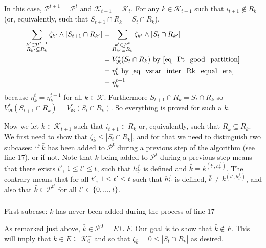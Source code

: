 \documentclass[
  11pt,
  a4paper,
]{article}
\makeatletter
\let\oldsubparagraph\subparagraph
\renewcommand{\subparagraph}{
    \@ifstar
      \xxxSubParagraphStar
      \xxxSubParagraphNoStar
  }
\newcommand{\xxxSubParagraphStar}[1]{\oldsubparagraph*{#1}\mbox{}}
\newcommand{\xxxSubParagraphNoStar}[1]{\oldsubparagraph{#1}\mbox{}}
\theoremstyle{plain}
\theoremstyle{definition}
\theoremstyle{plain}
\theoremstyle{definition}
\theoremstyle{plain}
\theoremstyle{remark}
\makeatother
\begin{document}
In this case, \(\mathcal{P}^{t+1}=\mathcal{P}^t\) and
\(\mathcal{K}_{t+1}=\mathcal{K}_t\). For any \(k\in\mathcal{K}_{t+1}\)
such that \(i_{t+1}\not\in R_k\) (or, equivalently, such that
\(S_{t+1}\cap R_k=S_t\cap R_k\)), \begin{align*}
\sum_{\substack{k'\in\mathcal{P}^{t+1} \\ R_{k'}\subseteq R_k}} \zeta_{k'}\wedge |S_{t+1}\cap R_{k'}|&=\sum_{\substack{k'\in\mathcal{P}^{t} \\ R_{k'}\subseteq R_k}} \zeta_{k'}\wedge |S_{t}\cap R_{k'}| \\
&=V^*_{\mathfrak{R}}(S_t\cap R_k) \text{ by~\eqref{eq_Pt_good_partition}}\\
&=\eta_k^t \text{ by~\eqref{eq_vstar_inter_Rk_equal_eta}}\\
&=\eta_k^{t+1}
\end{align*} because \(\eta_k^t=\eta_k^{t+1}\) for all
\(k\in\mathcal{K}\). Furthermore \(S_{t+1}\cap R_k=S_t\cap R_k\) so
\(V^*_{\mathfrak{R}}(S_{t+1}\cap R_k)=V^*_{\mathfrak{R}}(S_t\cap R_k)\).
So everything is proved for such a \(k\).

Now we let \(k\in\mathcal{K}_{t+1}\) such that \(i_{t+1}\in R_k\) or,
equivalently, such that \(R_{\bar k}\subseteq R_k\). We first need to
show that \(\zeta_{\bar k}\leq |S_t\cap R_{\bar k}|\), and for that we
need to distinguish two subcases: if \(\bar k\) has been added to
\(\mathcal{P}^t\) during a previous step of the algorithm (see line 17),
or if not. Note that \(\bar k\) being added to \(\mathcal{P}^t\) during
a previous step means that there exists \(t'\), \(1\leq t'\leq t\), such
that \(h^f_{t'}\) is defined and \(\bar k= k^{(t',h^f_{t'})}\). The
contrary means that for all \(t'\), \(1\leq t'\leq t\) such that
\(h^f_{t'}\) is defined, \(\bar k\neq k^{(t',h^f_{t'})}\), and also that
\(\bar k\in\mathcal{P}^{t'}\) for all \(t'\in\{0,\dotsc,t\}\).

\subparagraph{\texorpdfstring{First subcase: \(\bar k\) has never been
added during the process of line
17}{First subcase: \textbackslash bar k has never been added during the process of line 17}}\label{first-subcase-bar-k-has-never-been-added-during-the-process-of-line-17}

As remarked just above, \(\bar k\in\mathcal{P}^{0}=E\cup F\). Our goal
is to show that \(\bar k\not\in F\). This will imply that
\(\bar k\in E\subseteq \mathcal{K}_0^-\) and so that
\(\zeta_{\bar k}=0\leq| S_{t}\cap R_{\bar k} |\) as desired.
\end{document}
